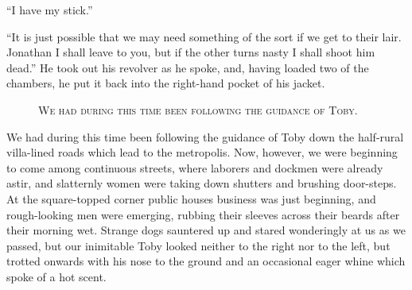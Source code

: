 \documentclass[12pt,english,oneside]{book}
\newcommand{\noun}[1]{\textsc{#1}}
\begin{document}
{}``I have my stick.''

{}``It is just possible that we may need something of the sort if
we get to their lair. Jonathan I shall leave to you, but if the other
turns nasty I shall shoot him dead.'' He took out his revolver as
he spoke, and, having loaded two of the chambers, he put it back into
the right-hand pocket of his jacket.

%
\begin{figure}[htbp]
\noindent {}

\noindent \begin{center}\noun{We had during this time been following
the guidance of Toby.}\end{center}
\end{figure}
We had during this time been following the guidance of Toby down the
half-rural villa-lined roads which lead to the metropolis. Now, however,
we were beginning to come among continuous streets, where laborers
and dockmen were already astir, and slatternly women were taking down
shutters and brushing door-steps. At the square-topped corner public
houses business was just beginning, and rough-looking men were emerging,
rubbing their sleeves across their beards after their morning wet.
Strange dogs sauntered up and stared wonderingly at us as we passed,
but our inimitable Toby looked neither to the right nor to the left,
but trotted onwards with his nose to the ground and an occasional
eager whine which spoke of a hot scent.
\end{document}

